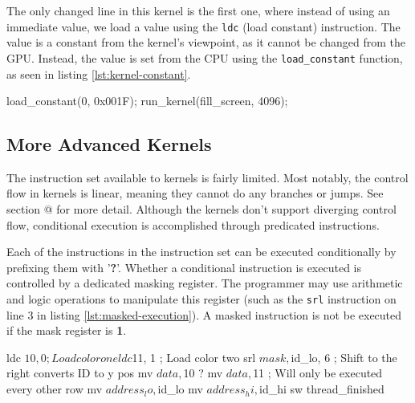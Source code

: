 \documentclass[../main/report.tex]{subfiles}
\begin{document}

The only changed line in this kernel is the first one,
where instead of using an immediate value, we load a value using the \verb/ldc/ (load constant) instruction.
The value is a constant from the kernel's viewpoint, as it cannot be changed from the GPU.
Instead, the value is set from the CPU using the \verb/load_constant/ function,
as seen in listing \ref{lst:kernel-constant}.

\begin{c-code}[caption=Now drawing a blue screen using parameters, label=lst:kernel-constant]
load_constant(0, 0x001F);
run_kernel(fill_screen, 4096);
\end{c-code}

\subsection{More Advanced Kernels}
The instruction set available to kernels is fairly limited.
Most notably, the control flow in kernels is linear, meaning they cannot do any branches or jumps. See section @ for more detail. 
Although the kernels don't support diverging control flow,
conditional execution is accomplished through predicated instructions.

Each of the instructions in the instruction set can be executed conditionally by prefixing them with '\textbf{?}'.
Whether a conditional instruction is executed is controlled by a dedicated masking register.
The programmer may use arithmetic and logic operations to manipulate this register (such as the \verb/srl/ instruction on line 3 in listing \ref{lst:masked-execution}).
A masked instruction is not be executed if the mask register is \textbf{1}.

\begin{assembly}[caption=Conditional execution using predicated instructions, label=lst:masked-execution]
ldc $10, 0 ; Load color one
ldc $11, 1 ; Load color two
srl $mask, $id_lo, 6 ; Shift to the right converts ID to y pos
mv $data, $10 
? mv $data, $11 ; Will only be executed every other row
mv $address_lo, $id_lo
mv $address_hi, $id_hi
sw
thread_finished
\end{assembly}
\end{document}
